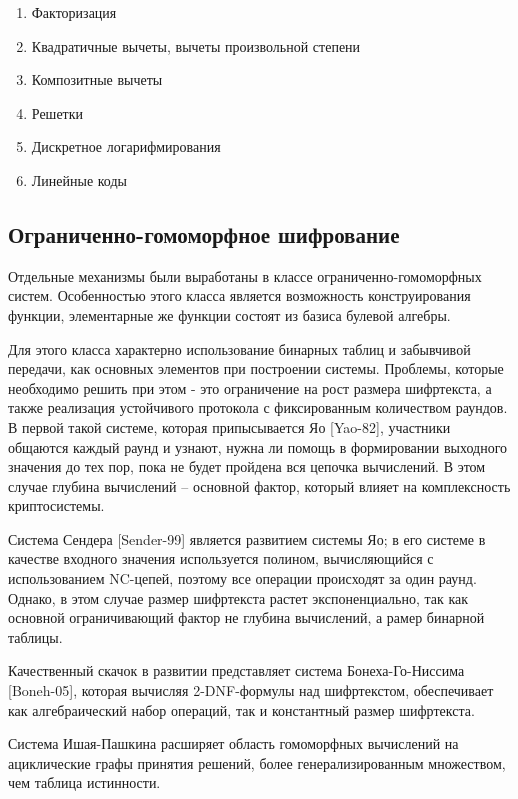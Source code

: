     \begin{enumerate}
        \item  Факторизация
        \item  Квадратичные вычеты, вычеты произвольной степени
        \item  Композитные вычеты
        \item  Решетки
        \item  Дискретное логарифмирования
        \item  Линейные коды
    \end{enumerate}
\normalcolor

\subsection{Ограниченно-гомоморфное шифрование}

\color{RoyalBlue}
    Отдельные механизмы были выработаны в классе ограниченно-гомоморфных систем. Особенностью этого класса является возможность конструирования функции, элементарные же функции состоят из базиса булевой алгебры.

    Для этого класса характерно использование бинарных таблиц и забывчивой передачи, как основных элементов при построении системы. Проблемы, которые необходимо решить при этом - это ограничение на рост размера шифртекста, а также реализация устойчивого протокола с фиксированным количеством раундов. В первой такой системе, которая припысывается Яо [Yao-82], участники общаются каждый раунд и узнают, нужна ли помощь в формировании выходного значения до тех пор, пока не будет пройдена вся цепочка вычислений. В этом случае глубина вычислений -- основной фактор, который влияет на комплексность криптосистемы.

    Система Сендера [Sender-99] является развитием системы Яо; в его системе в качестве входного значения используется полином, вычисляющийся с использованием NC-цепей, поэтому все операции происходят за один раунд. Однако, в этом случае размер шифртекста растет экспоненциально, так как основной ограничивающий фактор не глубина вычислений, а рамер бинарной таблицы. 

    Качественный скачок в развитии представляет система Бонеха-Го-Ниссима [Boneh-05], которая вычисляя 2-DNF-формулы над шифртекстом, обеспечивает как алгебраический набор операций, так и константный размер шифртекста.

    Система Ишая-Пашкина расширяет область гомоморфных вычислений на ациклические графы принятия решений, более генерализированным множеством, чем таблица истинности.


